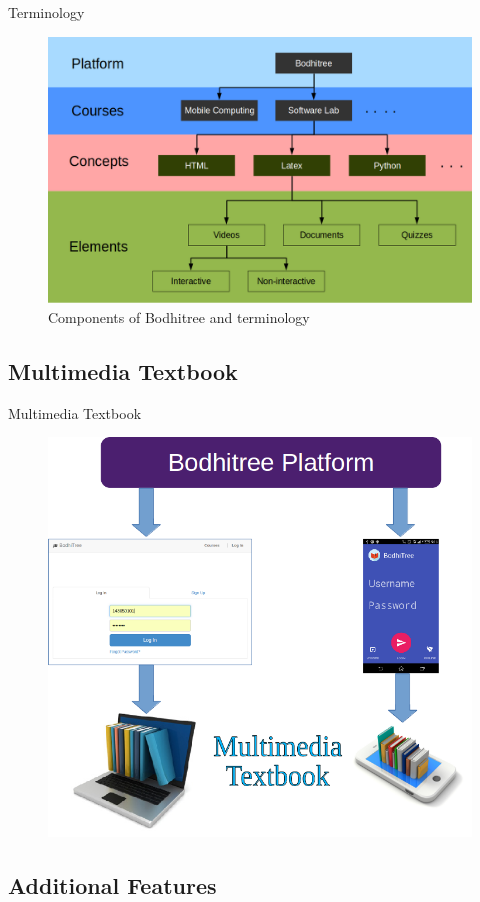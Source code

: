 \documentclass{beamer}
\begin{document}
\begin{frame}{Terminology}
	\begin{figure}
		\centering
		\includegraphics[width=0.8\linewidth]{media/bt}
		\caption{Components of Bodhitree and terminology}
		\label{fig:bt}
	\end{figure}

\end{frame}

\subsection{Multimedia Textbook}

\begin{frame}{Multimedia Textbook}
	\begin{figure}
		\centering
		\includegraphics[width=0.6\linewidth]{media/bmmt}
		\label{fig:bmmt}
	\end{figure}
\end{frame}

\subsection{Additional Features}
\end{document}
